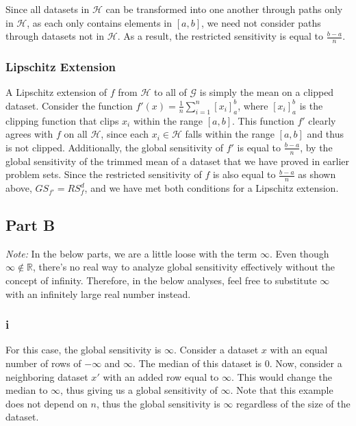 \documentclass[12pt]{article}
\begin{document}
\bigskip

Since all datasets in $\mathcal{H}$ can be transformed into one another through paths only in $\mathcal{H}$, as each only contains elements in $[a, b]$, we need not consider paths through datasets not in $\mathcal{H}$. As a result, the restricted sensitivity is equal to $\frac{b-a}{n}$.

\subsubsection{Lipschitz Extension}

\noindent

A Lipschitz extension of $f$ from $\mathcal{H}$ to all of $\mathcal{G}$ is simply the mean on a clipped dataset. Consider the function $f'(x) = \frac{1}{n} \sum_{i=1}^n [x_i]_a^b$, where $[x_i]_a^b$ is the clipping function that clips $x_i$ within the range $[a, b]$. This function $f'$ clearly agrees with $f$ on all $\mathcal{H}$, since each $x_i \in \mathcal{H}$ falls within the range $[a, b]$ and thus is not clipped. Additionally, the global sensitivity of $f'$ is equal to $\frac{b-a}{n}$, by the global sensitivity of the trimmed mean of a dataset that we have proved in earlier problem sets. Since the restricted sensitivity of $f$ is also equal to $\frac{b-a}{n}$ as shown above, $GS_{f'} = RS_f^d$, and we have met both conditions for a Lipschitz extension.

\subsection{Part B}

\noindent

\textit{Note:} In the below parts, we are a little loose with the term $\infty$. Even though $\infty \not \in \mathbb{R}$, there's no real way to analyze global sensitivity effectively without the concept of infinity. Therefore, in the below analyses, feel free to substitute $\infty$ with an infinitely large real number instead.

\subsubsection{i}

\noindent

For this case, the global sensitivity is $\infty$. Consider a dataset $x$ with an equal number of rows of $-\infty$ and $\infty$. The median of this dataset is $0$. Now, consider a neighboring dataset $x'$ with an added row equal to $\infty$. This would change the median to $\infty$, thus giving us a global sensitivity of $\infty$. Note that this example does not depend on $n$, thus the global sensitivity is $\infty$ regardless of the size of the dataset.
\end{document}
